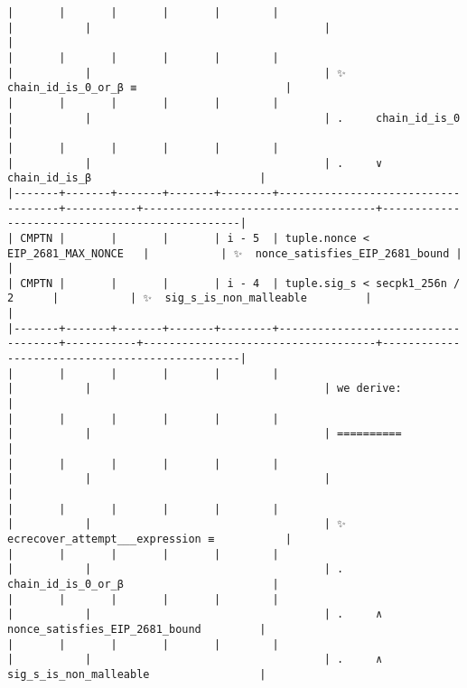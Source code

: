 \documentclass[varwidth=\maxdimen,margin=0.5cm,multi={verbatim}]{standalone}
\begin{document}
\begin{verbatim}
|       |       |       |       |        |                                    |           |                                    |                                                |
|       |       |       |       |        |                                    |           |                                    | ✨  chain_id_is_0_or_β ≡                       |
|       |       |       |       |        |                                    |           |                                    | .     chain_id_is_0                            |
|       |       |       |       |        |                                    |           |                                    | .     ∨ chain_id_is_β                          |
|-------+-------+-------+-------+--------+------------------------------------+-----------+------------------------------------+------------------------------------------------|
| CMPTN |       |       |       | i - 5  | tuple.nonce < EIP_2681_MAX_NONCE   |           | ✨  nonce_satisfies_EIP_2681_bound |                                                |
| CMPTN |       |       |       | i - 4  | tuple.sig_s < secpk1_256n / 2      |           | ✨  sig_s_is_non_malleable         |                                                |
|-------+-------+-------+-------+--------+------------------------------------+-----------+------------------------------------+------------------------------------------------|
|       |       |       |       |        |                                    |           |                                    | we derive:                                     |
|       |       |       |       |        |                                    |           |                                    | ==========                                     |
|       |       |       |       |        |                                    |           |                                    |                                                |
|       |       |       |       |        |                                    |           |                                    | ✨  ecrecover_attempt___expression ≡           |
|       |       |       |       |        |                                    |           |                                    | .     chain_id_is_0_or_β                       |
|       |       |       |       |        |                                    |           |                                    | .     ∧ nonce_satisfies_EIP_2681_bound         |
|       |       |       |       |        |                                    |           |                                    | .     ∧ sig_s_is_non_malleable                 |

\end{verbatim}
\end{document}
